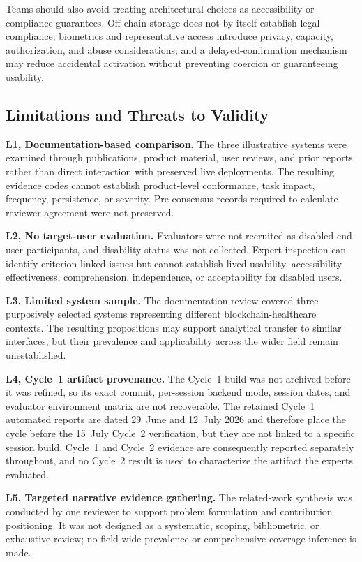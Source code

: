 \documentclass[journal]{IEEEtran}
\begin{document}
Teams should also avoid treating architectural choices as accessibility or compliance guarantees. Off-chain storage does not by itself establish legal compliance; biometrics and representative access introduce privacy, capacity, authorization, and abuse considerations; and a delayed-confirmation mechanism may reduce accidental activation without preventing coercion or guaranteeing usability.

\subsection{Limitations and Threats to Validity}

\noindent\textbf{L1, Documentation-based comparison.}
The three illustrative systems were examined through publications, product material, user reviews, and prior reports rather than direct interaction with preserved live deployments. The resulting evidence codes cannot establish product-level conformance, task impact, frequency, persistence, or severity. Pre-consensus records required to calculate reviewer agreement were not preserved.

\noindent\textbf{L2, No target-user evaluation.}
Evaluators were not recruited as disabled end-user participants, and disability status was not collected. Expert inspection can identify criterion-linked issues but cannot establish lived usability, accessibility effectiveness, comprehension, independence, or acceptability for disabled users.

\noindent\textbf{L3, Limited system sample.}
The documentation review covered three purposively selected systems representing different blockchain-healthcare contexts. The resulting propositions may support analytical transfer to similar interfaces, but their prevalence and applicability across the wider field remain unestablished.

\noindent\textbf{L4, Cycle~1 artifact provenance.}
The Cycle~1 build was not archived before it was refined, so its exact commit, per-session backend mode, session dates, and evaluator environment matrix are not recoverable. The retained Cycle~1 automated reports are dated 29~June and 12~July 2026 and therefore place the cycle before the 15~July Cycle~2 verification, but they are not linked to a specific session build. Cycle~1 and Cycle~2 evidence are consequently reported separately throughout, and no Cycle~2 result is used to characterize the artifact the experts evaluated.

\noindent\textbf{L5, Targeted narrative evidence gathering.}
The related-work synthesis was conducted by one reviewer to support problem formulation and contribution positioning. It was not designed as a systematic, scoping, bibliometric, or exhaustive review; no field-wide prevalence or comprehensive-coverage inference is made.
\end{document}
